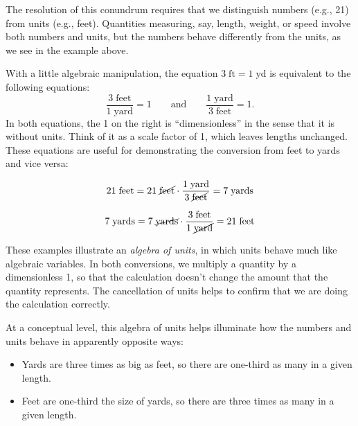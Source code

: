 \documentclass[nooutcomes]{ximera}
\begin{document}
The resolution of this conundrum requires that we distinguish numbers (e.g., 21) from units (e.g., feet).  Quantities measuring, say, length, weight, or speed involve both numbers and units, but the numbers behave differently from the units, as we see in the example above.  

With a little algebraic manipulation, the equation $3\;\textrm{ft} = 1\;\textrm{yd}$ is equivalent to the following equations:  
\[
\frac{3\;\textrm{feet}}{1\;\textrm{yard}} = 1\qquad \textrm{and}\qquad \frac{1\;\textrm{yard}}{3\;\textrm{feet}} = 1.
\]
In both equations, the 1 on the right is ``dimensionless'' in the sense that it is without units.  Think of it as a scale factor of 1, which leaves lengths unchanged.  These equations are useful for demonstrating the conversion from feet to yards and vice versa:  


\[
21\;\textrm{feet} = 21\;\cancel{\textrm{feet}} \cdot \frac{{1\;\textrm{yard}}}{3\;\cancel{\textrm{feet}}} = 7\;\textrm{yards}
\]

\[
7\;\textrm{yards} = 7\;\cancel{\textrm{yards}} \cdot \frac{{3\;\textrm{feet}}}{1\;\cancel{\textrm{yard}}} = 
21\;\textrm{feet}
\]

These examples illustrate an \emph{algebra of units}, in which units behave much like algebraic variables.  In both conversions, we multiply a quantity by a dimensionless 1, so that the calculation doesn't change the amount that the quantity represents.  The cancellation of units helps to confirm that we are doing the calculation correctly.  

At a conceptual level, this algebra of units helps illuminate how the numbers and units behave in apparently opposite ways:  

\begin{itemize}
\item Yards are three times as big as feet, so there are one-third as many in a given length.  
\item Feet are one-third the size of yards, so there are three times as many in a given length.  
\end{itemize}
\end{document}
